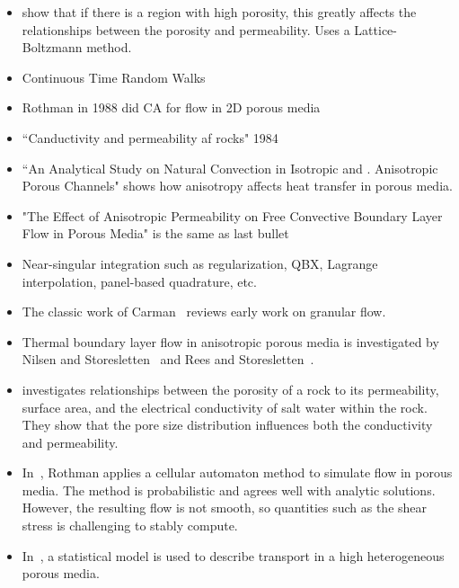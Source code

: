 \documentclass[preprint, 10pt]{elsarticle}
\begin{document}
\begin{itemize}
\item \cite{dar-mcc1998} show that if there is a region with high
porosity, this greatly affects the relationships between the porosity
and permeability.  Uses a Lattice-Boltzmann method.

\item Continuous Time Random Walks

\item Rothman in 1988 did CA for flow in 2D porous media

\item ``Canductivity and permeability af rocks" 1984

\item ``An Analytical Study on Natural Convection in Isotropic and .
Anisotropic Porous Channels" shows how anisotropy affects heat transfer
in porous media.

\item "The Effect of Anisotropic Permeability on Free Convective
Boundary Layer Flow in Porous Media" is the same as last bullet

\item Near-singular integration such as regularization, QBX, Lagrange
interpolation, panel-based quadrature, etc.

\item The classic work of Carman~\cite{car1937} reviews early work on
granular flow.

\item Thermal boundary layer flow in anisotropic porous media is
investigated by Nilsen and Storesletten~\cite{nil-sto1990} and Rees and
Storesletten~\cite{ree-sto1995}.

\item \cite{won-kop-tom1984} investigates relationships between the
porosity of a rock to its permeability, surface area, and the electrical
conductivity of salt water within the rock.  They show that the pore
size distribution influences both the conductivity and permeability.

\item In~\cite{rot1988}, Rothman applies a cellular automaton method to
simulate flow in porous media.  The method is probabilistic and agrees
well with analytic solutions.  However, the resulting flow is not
smooth, so quantities such as the shear stress is challenging to stably
compute.

\item In~\cite{leb-den-car2008}, a statistical model is used to describe
transport in a high heterogeneous porous media.


\end{itemize}
\end{document}
